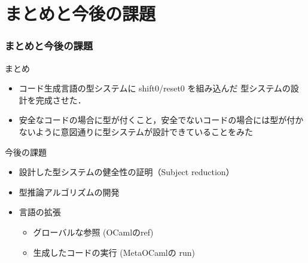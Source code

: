 \section{まとめと今後の課題}

\begin{frame}
  \frametitle{まとめと今後の課題}
  まとめ
  \begin{itemize}
  \item コード生成言語の型システムに shift0/reset0 を組み込んだ 型システムの設計を完成させた．
  \item 安全なコードの場合に型が付くこと，安全でないコードの場合には型が付かないように意図通りに型システムが設計できていることをみた
  \end{itemize}

  \vspace{\baselineskip}

  今後の課題
  \begin{itemize}
  \item 設計した型システムの健全性の証明（Subject reduction）
  \item 型推論アルゴリズムの開発
  \item 言語の拡張
    \begin{itemize}
    \item グローバルな参照 (OCamlのref)
    \item 生成したコードの実行 (MetaOCamlの run)
    \end{itemize}
  \end{itemize}
\end{frame}

